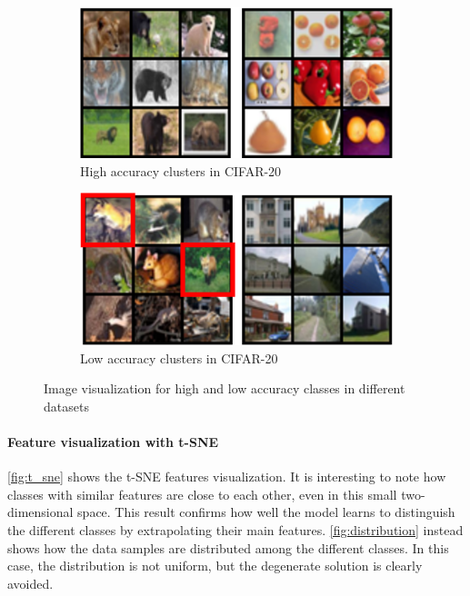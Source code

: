\documentclass{article}
\begin{document}
\begin{figure}[hbt]
     \begin{subfigure}[b]{0.48\textwidth}
         \centering
         \includegraphics[width=\textwidth]{images/high_accuracy_cifar20.png}
         \caption{High accuracy clusters in CIFAR-20}
         \label{fig:high_cifar20}
     \end{subfigure}
     \hfill
     \begin{subfigure}[b]{0.48\textwidth}
         \centering
         \includegraphics[width=\textwidth]{images/low_accuracy_cifar20.png}
         \caption{Low accuracy clusters in CIFAR-20}
         \label{fig:low_cifar20}
     \end{subfigure}
     \caption{Image visualization for high and low accuracy classes in different datasets }
     \label{fig:visualization}
\end{figure}

\paragraph{Feature visualization with t-SNE}\autoref{fig:t_sne} shows the t-SNE features visualization. It is interesting to note how classes with similar features are close to each other, even in this small two-dimensional space. This result confirms how well the model learns to distinguish the different classes by extrapolating their main features. \autoref{fig:distribution} instead shows how the data samples are distributed among the different classes. In this case, the distribution is not uniform, but the degenerate solution is clearly avoided.
\end{document}
